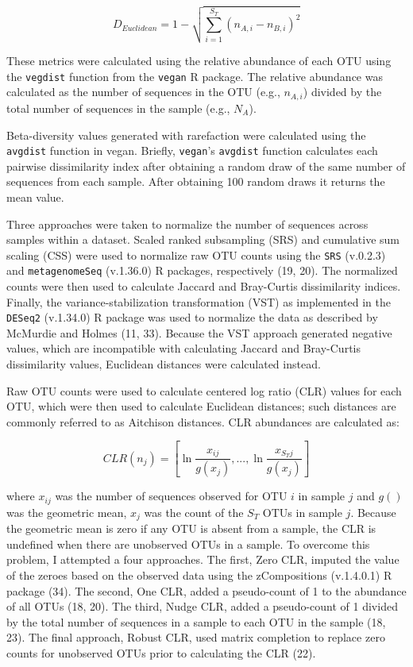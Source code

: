 \documentclass[
]{article}
\begin{document}
\[D_{Euclidean}=1-\sqrt{\sum_{i=1}^{S_T}\left(n_{A,i} - n_{B,i}\right)^2}\]

These metrics were calculated using the relative abundance of each OTU
using the \texttt{vegdist} function from the \texttt{vegan} R package.
The relative abundance was calculated as the number of sequences in the
OTU (e.g., \(n_{A,i}\)) divided by the total number of sequences in the
sample (e.g., \(N_A\)).

Beta-diversity values generated with rarefaction were calculated using
the \texttt{avgdist} function in vegan. Briefly, \texttt{vegan}'s
\texttt{avgdist} function calculates each pairwise dissimilarity index
after obtaining a random draw of the same number of sequences from each
sample. After obtaining 100 random draws it returns the mean value.

Three approaches were taken to normalize the number of sequences across
samples within a dataset. Scaled ranked subsampling (SRS) and cumulative
sum scaling (CSS) were used to normalize raw OTU counts using the
\texttt{SRS} (v.0.2.3) and \texttt{metagenomeSeq} (v.1.36.0) R packages,
respectively (19, 20). The normalized counts were then used to calculate
Jaccard and Bray-Curtis dissimilarity indices. Finally, the
variance-stabilization transformation (VST) as implemented in the
\texttt{DESeq2} (v.1.34.0) R package was used to normalize the data as
described by McMurdie and Holmes (11, 33). Because the VST approach
generated negative values, which are incompatible with calculating
Jaccard and Bray-Curtis dissimilarity values, Euclidean distances were
calculated instead.

Raw OTU counts were used to calculate centered log ratio (CLR) values
for each OTU, which were then used to calculate Euclidean distances;
such distances are commonly referred to as Aitchison distances. CLR
abundances are calculated as:

\[
CLR\left(n_j\right) = \left[ \ln\frac{x_{ij}}{g(x_j)}, ..., \ln\frac{x_{S_Tj}}{g(x_j)}\right]
\]

where \(x_{ij}\) was the number of sequences observed for OTU \(i\) in
sample \(j\) and \(g()\) was the geometric mean, \(x_j\) was the count
of the \(S_T\) OTUs in sample \(j\). Because the geometric mean is zero
if any OTU is absent from a sample, the CLR is undefined when there are
unobserved OTUs in a sample. To overcome this problem, I attempted a
four approaches. The first, Zero CLR, imputed the value of the zeroes
based on the observed data using the zCompositions (v.1.4.0.1) R package
(34). The second, One CLR, added a pseudo-count of 1 to the abundance of
all OTUs (18, 20). The third, Nudge CLR, added a pseudo-count of 1
divided by the total number of sequences in a sample to each OTU in the
sample (18, 23). The final approach, Robust CLR, used matrix completion
to replace zero counts for unobserved OTUs prior to calculating the CLR
(22).
\end{document}

